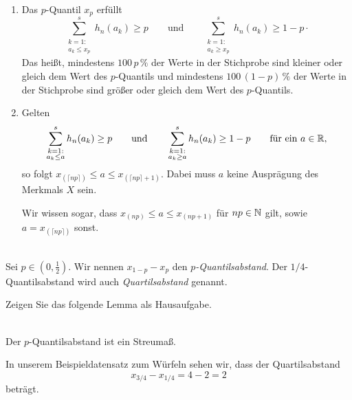 \begin{satz}
    \begin{enumerate}[label=(\alph*)]
        \item Das $p$-Quantil $x_p$ erfüllt
        \[
            \sum_{\substack{k=1:\\ a_k\leq x_p}}^s h_n(a_k) \geq p \qquad\text{und}\qquad \sum_{\substack{k=1:\\ a_k\geq x_p}}^s h_n(a_k) \geq 1-p \cdot
        \]
        Das heißt, mindestens $100\,p\,\%$ der Werte in der Stichprobe sind kleiner oder gleich dem Wert des $p$-Quantils und mindestens $100\,(1-p)\,\%$ der Werte in der Stichprobe sind größer oder gleich dem Wert des $p$-Quantils.
        \item Gelten
        \[
            \sum_{\substack{k=1:\\ a_k\leq a}}^s h_n(a_k)\geq p \qquad\text{und}\qquad \sum_{\substack{k=1:\\ a_k\geq a}}^s h_n(a_k)\geq 1-p \qquad\text{für ein } a\in\mathbb{R} ,
        \]
        so folgt $x_{(\lceil np\rceil)}\leq a\leq x_{(\lceil np\rceil+1)}$.
        Dabei muss $a$ keine Ausprägung des \gls{Merkmal}s $X$ sein.

        Wir wissen sogar, dass $x_{(np)}\leq a\leq x_{(np+1)}$ für $np\in\mathbb{N}$ gilt, sowie $a=x_{(\lceil np\rceil)}$ sonst.
    \end{enumerate}
\end{satz}

\begin{defi}[$p$-Quantilsabstand]
     \\
    Sei $p\in(0,\tfrac12)$.
    Wir nennen $x_{1-p}-x_p$ den \emph{$p$-Quantilsabstand}.
    Der $1/4$-\gls{Quantilsabstand} wird auch \emph{Quartilsabstand} genannt.
\end{defi}

Zeigen Sie das folgende Lemma als Hausaufgabe.

\begin{lem}
     \\
    Der $p$-\gls{Quantilsabstand} ist ein \gls{Streumaß}.
\end{lem}

In unserem Beispieldatensatz zum Würfeln sehen wir, dass der \gls{Quartilsabstand}
\[
    x_{3/4} - x_{1/4} = 4-2 = 2
\]
beträgt.


